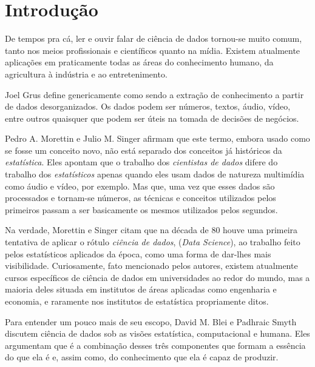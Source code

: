 
\chapter{Introdução}
\label{cap:introducao}


De tempos pra cá, ler e ouvir falar de ciência de dados tornou-se muito comum, tanto nos meios profissionais e científicos quanto na mídia. Existem atualmente aplicações em praticamente todas as áreas do conhecimento humano, da agricultura à indústria e ao entretenimento.

Joel Grus \citep{data} define genericamente  como sendo a extração de conhecimento a partir de dados desorganizados. Os dados podem ser números, textos, áudio, vídeo, entre outros quaisquer que podem ser úteis na tomada de decisões de negócios.

Pedro A. Morettin e Julio M. Singer \citep{apostila} afirmam que este termo, embora usado como se fosse um conceito novo, não está separado dos conceitos já históricos da \emph{estatística}. Eles apontam que o trabalho dos \emph{cientistas de dados} difere do trabalho dos \emph{estatísticos} apenas quando eles usam dados de natureza multimídia como áudio e vídeo, por exemplo. Mas que, uma vez que esses dados são processados e tornam-se números, as técnicas e conceitos utilizados pelos primeiros passam a ser basicamente os mesmos utilizados pelos segundos.

Na verdade, Morettin e Singer \citep{apostila} citam que na década de 80 houve uma primeira tentativa de aplicar o rótulo \emph{ciência de dados}, (\emph{Data Science}), ao trabalho feito pelos estatísticos aplicados da época, como uma forma de dar-lhes mais visibilidade. Curiosamente, fato mencionado pelos autores, existem atualmente cursos específicos de ciência de dados em universidades ao redor do mundo, mas a maioria deles situada em institutos de áreas aplicadas como engenharia e economia, e raramente nos institutos de estatística propriamente ditos.

Para entender um pouco mais de seu escopo, David M. Blei e Padhraic Smyth \citep{blei} discutem ciência de dados sob as visões estatística, computacional e humana. Eles argumentam que é a combinação desses três componentes que formam a essência do que ela é e, assim como, do conhecimento que ela é capaz de produzir.

